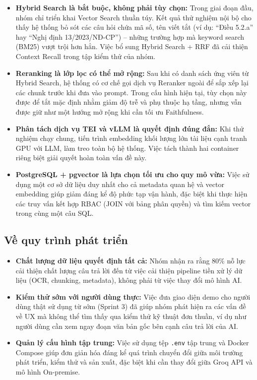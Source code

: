 \documentclass[12pt,a4paper]{report}
\begin{document}
\begin{itemize}
    \item \textbf{Hybrid Search là bắt buộc, không phải tùy chọn:} Trong giai đoạn đầu, nhóm chỉ triển khai Vector Search thuần túy. Kết quả thử nghiệm nội bộ cho thấy hệ thống bỏ sót các câu hỏi chứa mã số, tên viết tắt (ví dụ: ``Điều 5.2.a'' hay ``Nghị định 13/2023/NĐ-CP'') -- những trường hợp mà keyword search (BM25) vượt trội hơn hẳn. Việc bổ sung Hybrid Search + RRF \cite{rrf2009} đã cải thiện Context Recall trong tập kiểm thử của nhóm.
    \item \textbf{Reranking là lớp lọc có thể mở rộng:} Sau khi có danh sách ứng viên từ Hybrid Search, hệ thống có cơ chế gọi dịch vụ Reranker ngoài để sắp xếp lại các chunk trước khi đưa vào prompt. Trong cấu hình hiện tại, tùy chọn này được để tắt mặc định nhằm giảm độ trễ và phụ thuộc hạ tầng, nhưng vẫn được giữ như một hướng mở rộng khi cần tối ưu Faithfulness.
    \item \textbf{Phân tách dịch vụ TEI và vLLM là quyết định đúng đắn:} Khi thử nghiệm chạy chung, tiến trình embedding khối lượng lớn tài liệu cạnh tranh GPU với LLM, làm treo toàn bộ hệ thống. Việc tách thành hai container riêng biệt giải quyết hoàn toàn vấn đề này.
    \item \textbf{PostgreSQL + pgvector là lựa chọn tối ưu cho quy mô vừa:} Việc sử dụng một cơ sở dữ liệu duy nhất cho cả metadata quan hệ và vector embedding giúp giảm đáng kể độ phức tạp vận hành, đặc biệt khi thực hiện các truy vấn kết hợp RBAC (JOIN với bảng phân quyền) và tìm kiếm vector trong cùng một câu SQL.
\end{itemize}

\subsection{Về quy trình phát triển}

\begin{itemize}
    \item \textbf{Chất lượng dữ liệu quyết định tất cả:} Nhóm nhận ra rằng 80\% nỗ lực cải thiện chất lượng câu trả lời đến từ việc cải thiện pipeline tiền xử lý dữ liệu (OCR, chunking, metadata), không phải từ việc thay đổi mô hình AI.
    \item \textbf{Kiểm thử sớm với người dùng thực:} Việc đưa giao diện demo cho người dùng thật sử dụng từ sớm (Sprint 3) đã giúp nhóm phát hiện ra các vấn đề về UX mà không thể tìm thấy qua kiểm thử kỹ thuật đơn thuần, ví dụ như người dùng cần xem ngay đoạn văn bản gốc bên cạnh câu trả lời của AI.
    \item \textbf{Quản lý cấu hình tập trung:} Việc sử dụng tệp \texttt{.env} tập trung và Docker Compose giúp đơn giản hóa đáng kể quá trình chuyển đổi giữa môi trường phát triển, kiểm thử và sản xuất, đặc biệt khi cần thay đổi giữa Groq API và mô hình On-premise.
\end{itemize}
\end{document}
